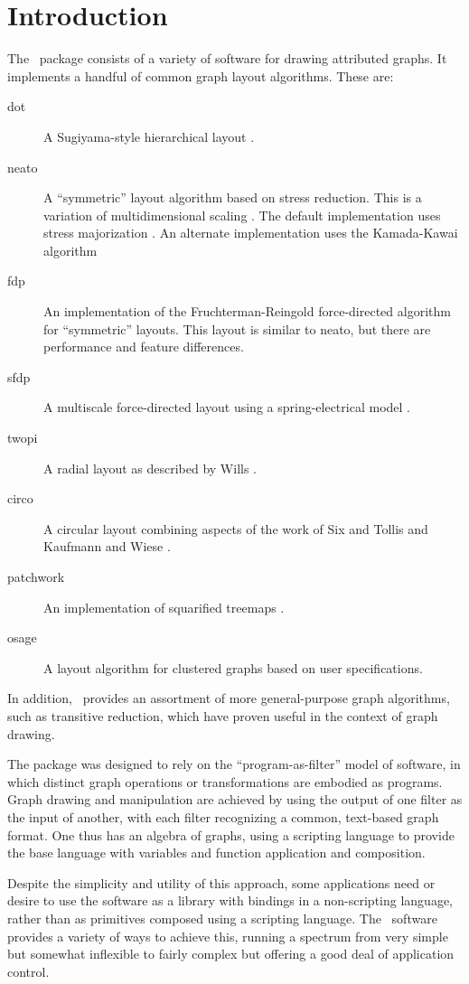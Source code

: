 \section{Introduction}
\label{sec:intro}
The \gviz\ package consists of a variety of software for drawing
attributed graphs. It implements a handful of common graph layout
algorithms. These are: 
\begin{description}
 \item[dot] A Sugiyama-style hierarchical layout \cite{stt,gknv:methods}.
 \item[neato] A ``symmetric'' layout algorithm based on stress reduction. 
This is a variation of multidimensional scaling \cite{kruskal,cohen}. The
default implementation uses stress majorization \cite{gkn}. 
An alternate implementation uses the Kamada-Kawai algorithm \cite{kk}
 \item[fdp] An implementation of the Fruchterman-Reingold force-directed
algorithm \cite{fr}
for ``symmetric'' layouts. This layout is similar to neato, but there
are performance and feature differences. 
 \item[sfdp] A multiscale force-directed layout using a spring-electrical
model \cite{sfdp}.
 \item[twopi] A radial layout as described by Wills \cite{nicheworks}.
 \item[circo] A circular layout combining aspects of the
work of Six and Tollis \cite{st,st2} and Kaufmann and Wiese \cite{kw}.
 \item[patchwork] An implementation of squarified treemaps \cite{sqtreemap}.
 \item[osage] A layout algorithm for clustered graphs based on user specifications.
\end{description}
In addition, \gviz\ provides an assortment of more general-purpose
graph algorithms, such as transitive reduction, which have proven useful in
the context of graph drawing.

The package was designed \cite{gviz}
 to rely on the
``program-as-filter'' model of software, in which distinct graph
operations or transformations are embodied as programs. Graph drawing
and manipulation are achieved by using the output of one filter as
the input of another, with each filter recognizing a common, text-based
graph format.
One thus has an algebra of graphs, using a scripting language to provide
the base language with variables and function application and composition.

Despite the simplicity and utility of this approach, some
applications need or desire to use the software as a library with
bindings in a non-scripting language, rather than as primitives composed
using a scripting language. The \gviz\ software provides a variety of 
ways to achieve
this, running a spectrum from very simple but somewhat inflexible to
fairly complex but offering a good deal of application control.

